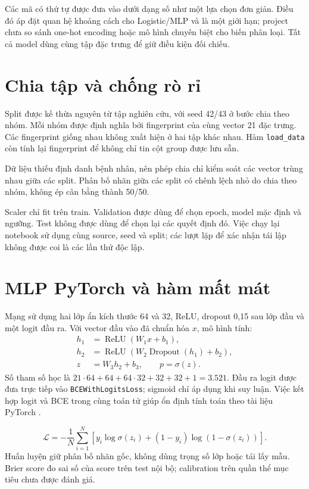 Các mã có thứ tự được đưa vào dưới dạng số như một lựa chọn đơn giản. Điều đó áp đặt quan hệ khoảng cách cho Logistic/MLP và là một giới hạn; project chưa so sánh one-hot encoding hoặc mô hình chuyên biệt cho biến phân loại. Tất cả model dùng cùng tập đặc trưng để giữ điều kiện đối chiếu.

\section{Chia tập và chống rò rỉ}

Split được kế thừa nguyên từ tập nghiên cứu, với seed 42/43 ở bước chia theo nhóm. Mỗi nhóm được định nghĩa bởi fingerprint của cùng vector 21 đặc trưng. Các fingerprint giống nhau không xuất hiện ở hai tập khác nhau. Hàm \texttt{load\_data} còn tính lại fingerprint để không chỉ tin cột group được lưu sẵn.

Dữ liệu thiếu định danh bệnh nhân, nên phép chia chỉ kiểm soát các vector trùng nhau giữa các split. Phân bố nhãn giữa các split có chênh lệch nhỏ do chia theo nhóm, không ép cân bằng thành 50/50.

Scaler chỉ fit trên train. Validation được dùng để chọn epoch, model mặc định và ngưỡng. Test không được dùng để chọn lại các quyết định đó. Việc chạy lại notebook sử dụng cùng source, seed và split; các lượt lặp để xác nhận tái lập không được coi là các lần thử độc lập.

\section{MLP PyTorch và hàm mất mát}
Mạng sử dụng hai lớp ẩn kích thước 64 và 32, ReLU, dropout 0,15 sau lớp đầu và một logit đầu ra. Với vector đầu vào đã chuẩn hóa $x$, mô hình tính:
\begin{align}
h_1 &= \operatorname{ReLU}(W_1x+b_1),\\
h_2 &= \operatorname{ReLU}(W_2\operatorname{Dropout}(h_1)+b_2),\\
z &= W_3h_2+b_3, \qquad p=\sigma(z).
\end{align}
Số tham số học là $21\cdot64+64+64\cdot32+32+32+1=3.521$. Đầu ra logit được đưa trực tiếp vào \texttt{BCEWithLogitsLoss}; sigmoid chỉ áp dụng khi suy luận. Việc kết hợp logit và BCE trong cùng toán tử giúp ổn định tính toán theo tài liệu PyTorch \cite{pytorch_bce}.

\begin{equation}
\mathcal{L}=-\frac{1}{N}\sum_{i=1}^{N}\left[y_i\log\sigma(z_i)+(1-y_i)\log(1-\sigma(z_i))\right].
\end{equation}
Huấn luyện giữ phân bố nhãn gốc, không dùng trọng số lớp hoặc tái lấy mẫu. Brier score đo sai số của score trên test nội bộ; calibration trên quần thể mục tiêu chưa được đánh giá.

